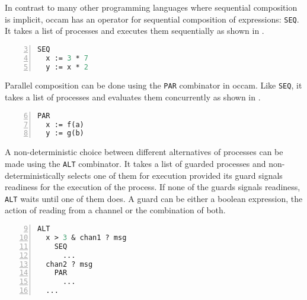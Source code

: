 In contrast to many other programming languages where sequential composition is implicit, \textsf{occam} has an operator for sequential composition of expressions: \texttt{SEQ}. It takes a list of processes and executes them sequentially as shown in .

\begin{lstlisting}[language=Caml, caption=Sequential composition of processes in \textsf{occam}., label=lst:occam_seq, numbers=left, frame=bt, firstnumber=3]
SEQ
  x := 3 * 7
  y := x * 2
\end{lstlisting}

Parallel composition can be done using the \texttt{PAR} combinator in \textsf{occam}. Like \texttt{SEQ}, it takes a list of processes and evaluates them concurrently as shown in .

\begin{lstlisting}[language=Caml, caption=Parallel composition of processes in \textsf{occam}., label=lst:occam_par, numbers=left, frame=bt, firstnumber=6]
PAR
  x := f(a)
  y := g(b)
\end{lstlisting}

A non-deterministic choice between different alternatives of processes can be made using the \texttt{ALT} combinator. It takes a list of guarded processes and non-deterministically selects one of them for execution provided its guard signals readiness for the execution of the process. If none of the guards signals readiness, \texttt{ALT} waits until one of them does. A guard can be either a boolean expression, the action of reading from a channel or the combination of both.

\begin{lstlisting}[language=Caml, caption=Choice between process alternatives in \textsf{occam}., label=lst:occam_par, numbers=left, frame=bt, firstnumber=9]
ALT
  x > 3 & chan1 ? msg
    SEQ
      ...
  chan2 ? msg
    PAR
      ...
  ...
\end{lstlisting}

\clearpage
